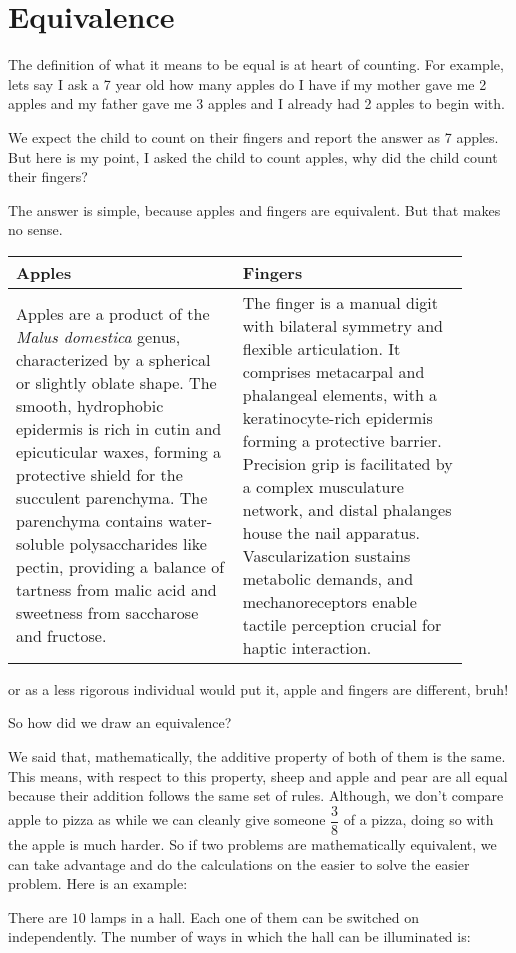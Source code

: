 \section{Equivalence}
The definition of what it means to be equal is at heart of counting. For example, 
lets say I ask a 7 year old how many apples do I have if my mother gave me 2 apples and 
my father gave me 3 apples and I already had 2 apples to begin with.\par
We expect the child to count on their fingers and report the answer as 7 apples. 
But here is my point, I asked the child to count apples, why did the child count their fingers?\par
The answer is simple, because apples and fingers are equivalent. But that makes no sense.
\begin{table}[H]
    \centering
    \begin{tabular}{|p{0.45\linewidth}|p{0.45\linewidth}|}
        \hline
        \textbf{Apples} & \textbf{Fingers} \\
        \hline
        Apples are a product of the \textit{Malus domestica} genus, 
        characterized by a spherical or slightly oblate shape. The smooth,
         hydrophobic epidermis is rich in cutin and epicuticular waxes, 
         forming a protective shield for the succulent parenchyma. 
         The parenchyma contains water-soluble polysaccharides like pectin, 
         providing a balance of tartness from malic acid and sweetness from 
         saccharose and fructose. & 
         The finger is a manual digit with bilateral symmetry and flexible articulation. 
         It comprises metacarpal and phalangeal elements, with a keratinocyte-rich epidermis 
         forming a protective barrier. Precision grip is facilitated by a complex musculature 
         network, and distal phalanges house the nail apparatus. Vascularization sustains metabolic 
         demands, and mechanoreceptors enable tactile perception crucial for haptic interaction. \\
        \hline
    \end{tabular}
\end{table}
or as a less rigorous individual would put it, apple and fingers are different, bruh!\par
So how did we draw an equivalence?\par
We said that, mathematically, the additive property of both of them is the same. This means, 
with respect to this property, sheep and apple and pear are all equal because their addition 
follows the same set of rules. Although, we don't compare apple to pizza as while we can cleanly 
give someone $\dfrac{3}{8}$ of a pizza, doing so with the apple is much harder. So if two problems 
are mathematically equivalent, we can take advantage and do the calculations on the easier to solve
 the easier problem. Here is an example:
\begin{example}
There are $10$ lamps in a hall. Each one of them can be switched on independently.
The number of ways in which the hall can be illuminated is:    
\end{example}


